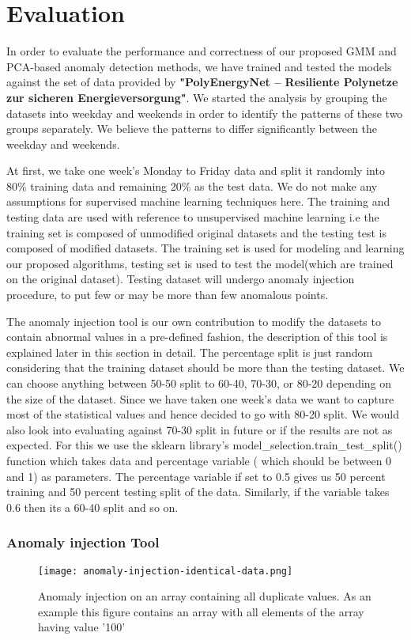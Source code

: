 \chapter{Evaluation}

In order to evaluate the performance and correctness of our proposed GMM and PCA-based anomaly detection methods, we have trained and tested the models against the set of data provided by \textbf{"PolyEnergyNet – Resiliente Polynetze zur sicheren Energieversorgung"}. We started the analysis by grouping the datasets into weekday and weekends in order to identify the patterns of these two groups separately. We believe the patterns to differ significantly between the weekday and weekends. 

At first, we take one week's Monday to Friday data and split it randomly into 80\% training data and remaining 20\% as the test data. We do not make any assumptions for supervised machine learning techniques here. The training and testing data are used with reference to unsupervised machine learning i.e the training set is composed of unmodified original datasets and the testing test is composed of modified datasets. The training set is used for modeling and learning our proposed algorithms, testing set is used to test the model(which are trained on the original dataset). Testing dataset will undergo anomaly injection procedure, to put few or may be more than few anomalous points. 

The anomaly injection tool is our own contribution to modify the datasets to contain abnormal values in a pre-defined fashion, the description of this tool is explained later in this section in detail. The percentage split is just random considering that the training dataset should be more than the testing dataset. We can choose anything between 50-50 split to 60-40, 70-30, or 80-20 depending on the size of the dataset. Since we have taken one week's data we want to capture most of the statistical values and hence decided to go with 80-20 split. We would also look into evaluating against 70-30 split in future or if the results are not as expected. For this we use the sklearn library's model\_selection.train\_test\_split() function which takes data and percentage variable ( which should be between 0 and 1) as parameters. The percentage variable if set to 0.5 gives us 50 percent training and 50 percent testing split of the data. Similarly, if the variable takes 0.6 then its a 60-40 split and so on. \\

\subsection*{\textbf{Anomaly injection Tool}} 
\begin{figure}
\centerline{\texttt{[image: anomaly-injection-identical-data.png]}}
    \caption{Anomaly injection on an array containing all duplicate values. As an example this figure contains an array with all elements of the array having value '100'}
    \label{fig:ai_iden}
\end{figure}

